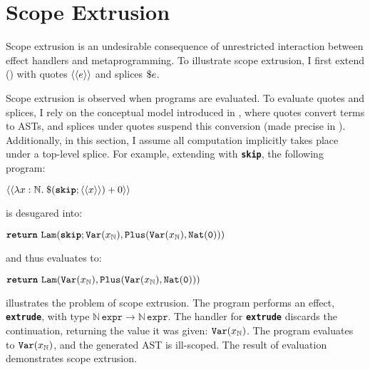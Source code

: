 \section{Scope Extrusion}\label{section:scope-extrusion-technical}
Scope extrusion is an undesirable consequence of unrestricted interaction between effect handlers and metaprogramming. To illustrate scope extrusion, I first extend \efflang{} () with quotes $\equote$ and splices $\splice$. 

Scope extrusion is observed when programs are evaluated. To evaluate quotes and splices, I rely on the conceptual model introduced in , where quotes convert terms to ASTs, and splices under quotes suspend this conversion (made precise in ). Additionally, in this section, I assume all computation implicitly takes place under a top-level splice. For example, extending \efflang{} with \textbf{\texttt{skip}}, the following program:
\begin{eff}
$\equote[{\lambda x: \mathbb{N}. \; \splice[{(\textbf{\texttt{skip}}; \equote[x])}] + 0}]$
\end{eff}
is desugared into:
\begin{eff}
$\return{\Lam{\textbf{\texttt{skip}}; \Var{x}{\mathbb{N}}}{\texttt{Plus}(\Var{x}{\mathbb{N}}, \texttt{Nat}(\texttt{0}))}}$
\end{eff}
and thus evaluates to:
\begin{eff}
$\return{\Lam{\Var{x}{\mathbb{N}}}{\texttt{Plus}(\Var{x}{\mathbb{N}}, \texttt{Nat}(\texttt{0}))}}$
\end{eff}

 illustrates the problem of scope extrusion. The program performs an effect, \textbf{\texttt{extrude}}, with type $\mathbb{N} \,  \texttt{expr} \to \mathbb{N} \, \texttt{expr}$. The handler for \textbf{\texttt{extrude}} discards the continuation, returning the value it was given: $\Var{x}{\mathbb{N}}$. The program evaluates to $\Var{x}{\mathbb{N}}$, and the generated AST is ill-scoped. The result of evaluation demonstrates scope extrusion.

